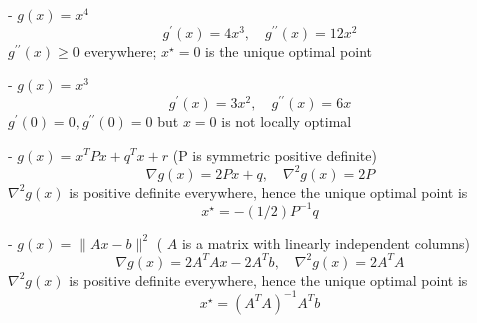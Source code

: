 \begin{example}
    - $ g(x)=x^{4} $
\begin{equation}
g^{\prime}(x)=4 x^{3}, \quad g^{\prime \prime}(x)=12 x^{2}
\end{equation}
$ g^{\prime \prime}(x) \geq 0 $ everywhere; $ x^{\star}=0 $ is the unique optimal point
\end{example}

\begin{example}
    - $ g(x)=x^{3} $
\begin{equation}
g^{\prime}(x)=3 x^{2}, \quad g^{\prime \prime}(x)=6 x
\end{equation}
$ g^{\prime}(0)=0, g^{\prime \prime}(0)=0 $ but $ x=0 $ is not locally optimal
\end{example}

\begin{example}
    - $ g(x)=x^{T} P x+q^{T} x+r $ (P is symmetric positive definite)
\begin{equation}
\nabla g(x)=2 P x+q, \quad \nabla^{2} g(x)=2 P
\end{equation}
$ \nabla^{2} g(x) $ is positive definite everywhere, hence the unique optimal point is
\begin{equation}
x^{\star}=-(1 / 2) P^{-1} q
\end{equation}
\end{example}

\begin{example}
    - $ g(x)=\|A x-b\|^{2} $ ( $ A $ is a matrix with linearly independent columns)
\begin{equation}
\nabla g(x)=2 A^{T} A x-2 A^{T} b, \quad \nabla^{2} g(x)=2 A^{T} A
\end{equation}
$ \nabla^{2} g(x) $ is positive definite everywhere, hence the unique optimal point is
\begin{equation}
x^{\star}=\left(A^{T} A\right)^{-1} A^{T} b
\end{equation}
\end{example}

